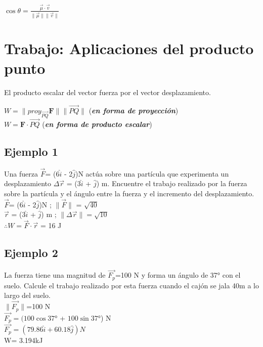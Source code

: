\documentclass[letterpaper,12pt]{article}
\begin{document}
\begin{sloppypar}
\begin{center}
    $\displaystyle \cos \theta = \frac{\vec{\mu}\cdot\vec{v}}{\|\vec{\mu}\| \|\vec{v}\|}$
\end{center}


\section{Trabajo: Aplicaciones del producto punto}
\noindent El producto escalar del vector fuerza por el vector desplazamiento. 

\begin{center}
    $W = \|proy_{\vec{PQ}}\textbf{F}\| \|\vec{PQ}\|$ \textcolor[rgb]{1,0,0}{(\textbf{\textit{en forma de proyección}})}
    \vspace{0.3cm}\\
    $W = \textbf{F} \cdot \vec{PQ}$ \textcolor[rgb]{1,0,0}{(\textbf{\textit{en forma de producto escalar}})} 
\end{center}
\subsection{Ejemplo 1}
\noindent Una fuerza $\vec{F}$= (6$\hat{i}$ - 2$\hat{j}$)N actúa sobre una partícula que experimenta un desplazamiento $\Delta \vec{r}$ = (3$\hat{i}$ + $\hat{j}$) m. Encuentre el trabajo realizado por la fuerza sobre la partícula y el ángulo entre la fuerza y el incremento del desplazamiento.
\vspace{0.3cm}\\
$\vec{F}$= (6$\hat{i}$ - 2$\hat{j}$)N   ;   $\|\vec{F} \|$ = $\sqrt{40}$
\vspace{0.3cm}\\
$\vec{r}$ = (3$\hat{i}$ + $\hat{j}$) m  ;   $\|\Delta\vec{r}\| = \sqrt{10}$
\vspace{0.3cm}\\
$\therefore W= \vec{F} \cdot \vec{r}$ = 16 J
\subsection{Ejemplo 2}
\noindent La fuerza tiene una magnitud de $\vec{F_{p}}$=100 N y forma un ángulo de 37° con el suelo. Calcule el trabajo realizado por esta fuerza cuando el cajón se jala 40m a lo largo del suelo.
\vspace{0.3cm}\\
$\|\vec{F_{p}}\|$=100 N 
\vspace{0.3cm}\\
$\vec{F_{p}} = (100 \cos 37$° + $100 \sin 37$°) N
\vspace{0.3cm}\\
$\vec{F_{p}} = (79.86 \hat{i} + 60.18 \hat{j}) N$
\vspace{0.3cm}\\
W= 3.194kJ
\newpage


\end{sloppypar}
\end{document}
